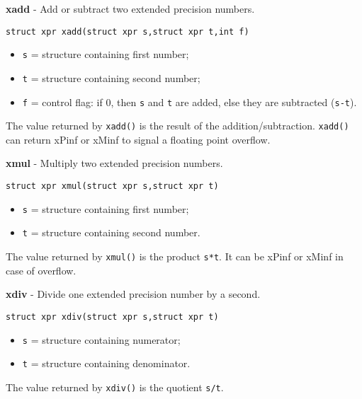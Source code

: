 \documentclass{article}
\begin{document}
\textbf{xadd} - Add  or subtract two extended precision numbers.

\begin{verbatim}
struct xpr xadd(struct xpr s,struct xpr t,int f)
\end{verbatim}

\begin{itemize}
\item \texttt{s} = structure containing first number;
\item \texttt{t} = structure containing second number;
\item \texttt{f} = control flag: if 0, then  \texttt{s} and \texttt{t} are added,
else they are subtracted (\texttt{s-t}).
\end{itemize}

The value returned by \texttt{xadd()} is the result
of the addition/subtraction. \texttt{xadd()} can return xPinf or xMinf to
signal a floating point overflow.


\hrulefill{}

\textbf{xmul} - Multiply two extended precision numbers.

\begin{verbatim}
struct xpr xmul(struct xpr s,struct xpr t)
\end{verbatim}

\begin{itemize}
\item \texttt{s} = structure containing first number;
\item \texttt{t} = structure containing second number.
\end{itemize}

The value returned by \texttt{xmul()} is the product \texttt{s*t}. 
It can be xPinf or xMinf in case of overflow.


\hrulefill{}

\textbf{xdiv} - Divide one extended precision number by a second.

\begin{verbatim}
struct xpr xdiv(struct xpr s,struct xpr t)
\end{verbatim}

\begin{itemize}
\item \texttt{s} = structure containing numerator;
\item \texttt{t} = structure containing denominator.
\end{itemize}

The value returned by \texttt{xdiv()} is the quotient \texttt{s/t}.
\end{document}
